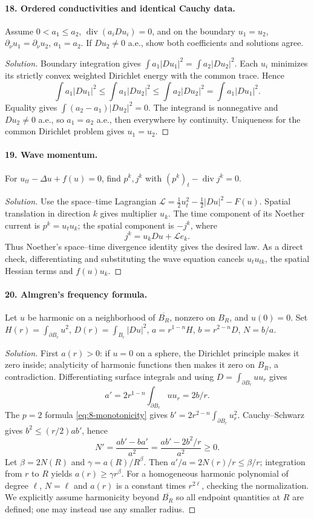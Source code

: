 \paragraph{18. Ordered conductivities and identical Cauchy data.}
Assume $0<a_1\leq a_2$, $\operatorname{div}(a_iDu_i)=0$, and on the
boundary $u_1=u_2$, $\partial_\nu u_1=\partial_\nu u_2$, $a_1=a_2$.
If $Du_2\ne0$ a.e., show both coefficients and solutions agree.
\begin{proof}[Solution]
Boundary integration gives $\int a_1|Du_1|^2=\int a_2|Du_2|^2$.
Each $u_i$ minimizes its strictly convex weighted Dirichlet energy with
the common trace. Hence
\[
 \int a_1|Du_1|^2\leq\int a_1|Du_2|^2
 \leq\int a_2|Du_2|^2=\int a_1|Du_1|^2.
\]
Equality gives $\int(a_2-a_1)|Du_2|^2=0$. The integrand is nonnegative
and $Du_2\ne0$ a.e., so $a_1=a_2$ a.e., then everywhere by continuity.
Uniqueness for the common Dirichlet problem gives $u_1=u_2$.
\end{proof}

\Needspace{30mm}
\paragraph{19. Wave momentum.}
For $u_{tt}-\Delta u+f(u)=0$, find $p^k,j^k$ with
$(p^k)_t-\operatorname{div}j^k=0$.
\begin{proof}[Solution]
Use the space--time Lagrangian
$\mathcal L=\frac12u_t^2-\frac12|Du|^2-F(u)$.
Spatial translation in direction $k$ gives multiplier $u_k$.
The time component of its Noether current is $p^k=u_tu_k$;
the spatial component is $-j^k$, where
\[
 j^k=u_kDu+\mathcal L e_k.
\]
Thus Noether's space--time divergence identity gives the desired law.
As a direct check, differentiating and substituting the wave equation
cancels $u_tu_{tk}$, the spatial Hessian terms and $f(u)u_k$.
\end{proof}

\Needspace{30mm}
\paragraph{20. Almgren's frequency formula.}
Let $u$ be harmonic on a neighborhood of $\overline{B_R}$, nonzero on
$B_R$, and $u(0)=0$. Set
$H(r)=\int_{\partial B_r}u^2$, $D(r)=\int_{B_r}|Du|^2$,
$a=r^{1-n}H$, $b=r^{2-n}D$, $N=b/a$.
\begin{proof}[Solution]
First $a(r)>0$: if $u=0$ on a sphere, the Dirichlet principle makes it
zero inside; analyticity of harmonic functions then makes it zero on
$B_R$, a contradiction. Differentiating surface integrals and using
$D=\int_{\partial B_r}uu_r$ gives
\[
 a'=2r^{1-n}\int_{\partial B_r}uu_r=2b/r.
\]
The $p=2$ formula \eqref{eq:8-monotonicity} gives
$b'=2r^{2-n}\int_{\partial B_r}u_r^2$.
Cauchy--Schwarz gives $b^2\leq(r/2)ab'$, hence
\[
 N'=\frac{ab'-ba'}{a^2}
     =\frac{ab'-2b^2/r}{a^2}\geq0.
\]
Let $\beta=2N(R)$ and $\gamma=a(R)/R^\beta$.
Then $a'/a=2N(r)/r\leq\beta/r$; integration from $r$ to $R$ yields
$a(r)\geq\gamma r^\beta$.
For a homogeneous harmonic polynomial of degree $\ell$, $N=\ell$ and
$a(r)$ is a constant times $r^{2\ell}$, checking the normalization.
We explicitly assume harmonicity beyond $\overline{B_R}$ so all endpoint
quantities at $R$ are defined; one may instead use any smaller radius.
\end{proof}

